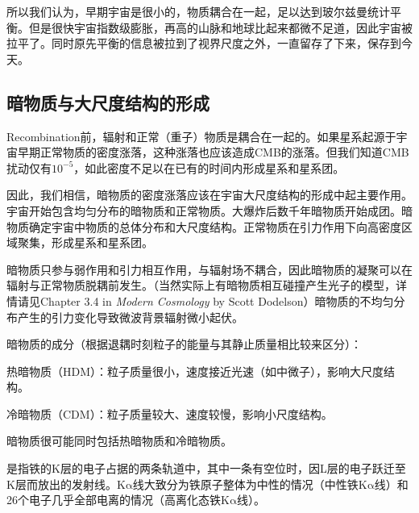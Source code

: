 \documentclass[../天体物理基础.tex]{subfiles}
\begin{document}
所以我们认为，早期宇宙是很小的，物质耦合在一起，足以达到玻尔兹曼统计平衡。但是很快宇宙指数级膨胀，再高的山脉和地球比起来都微不足道，因此宇宙被拉平了。同时原先平衡的信息被拉到了视界尺度之外，一直留存了下来，保存到今天。

\subsection{暗物质与大尺度结构的形成}
Recombination前，辐射和正常（重子）物质是耦合在一起的。如果星系起源于宇宙早期正常物质的密度涨落，这种涨落也应该造成CMB的涨落。但我们知道CMB扰动仅有$10^{-5}$，如此密度不足以在已有的时间内形成星系和星系团。

因此，我们相信，暗物质的密度涨落应该在宇宙大尺度结构的形成中起主要作用。宇宙开始包含均匀分布的暗物质和正常物质。大爆炸后数千年暗物质开始成团。暗物质确定宇宙中物质的总体分布和大尺度结构。正常物质在引力作用下向高密度区域聚集，形成星系和星系团。

暗物质只参与弱作用和引力相互作用，与辐射场不耦合，因此暗物质的凝聚可以在辐射与正常物质脱耦前发生。（当然实际上有暗物质相互碰撞产生光子的模型，详情请见Chapter 3.4 in \textit{Modern Cosmology} by Scott Dodelson）暗物质的不均匀分布产生的引力变化导致微波背景辐射微小起伏。

暗物质的成分（根据退耦时刻粒子的能量与其静止质量相比较来区分）：

热暗物质（HDM）：粒子质量很小，速度接近光速（如中微子），影响大尺度结构。

冷暗物质（CDM）：粒子质量较大、速度较慢，影响小尺度结构。

暗物质很可能同时包括热暗物质和冷暗物质。

是指铁的K层的电子占据的两条轨道中，其中一条有空位时，因L层的电子跃迁至K层而放出的发射线。$\mathrm{K\alpha}$线大致分为铁原子整体为中性的情况（中性铁$\mathrm{K\alpha}$线）和26个电子几乎全部电离的情况（高离化态铁$\mathrm{K\alpha}$线）。


\printbibliography
\end{document}
